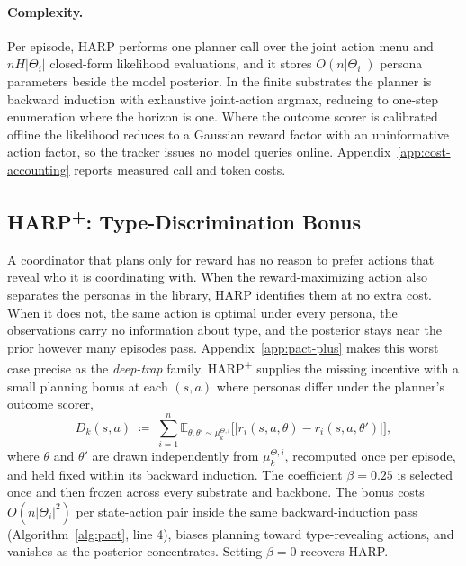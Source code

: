 \documentclass[letterpaper]{article} %
\begin{document}
\paragraph{Complexity.} Per episode, HARP performs one planner call over the joint action menu and $nH|\Theta_i|$ closed-form likelihood evaluations, and it stores $O(n|\Theta_i|)$ persona parameters beside the model posterior. In the finite substrates the planner is backward induction with exhaustive joint-action argmax, reducing to one-step enumeration where the horizon is one. Where the outcome scorer is calibrated offline the likelihood reduces to a Gaussian reward factor with an uninformative action factor, so the tracker issues no model queries online. Appendix~\ref{app:cost-accounting} reports measured call and token costs.

\subsection{HARP\textsuperscript{+}: Type-Discrimination Bonus}
\label{sec:pact-plus-algo}

A coordinator that plans only for reward has no reason to prefer actions that reveal who it is coordinating with. When the reward-maximizing action also separates the personas in the library, HARP identifies them at no extra cost. When it does not, the same action is optimal under every persona, the observations carry no information about type, and the posterior stays near the prior however many episodes pass. Appendix~\ref{app:pact-plus} makes this worst case precise as the \emph{deep-trap} family. HARP\textsuperscript{+} supplies the missing incentive with a small planning bonus at each $(s,a)$ where personas differ under the planner's outcome scorer,
\begin{equation}
\label{eq:bonus}
D_k(s,a) \;\coloneqq\; \sum_{i=1}^n \mathbb{E}_{\theta, \theta' \sim \mu_k^{\Theta,i}}\!\big[|r_i(s,a,\theta) - r_i(s,a,\theta')|\big],
\end{equation}
where $\theta$ and $\theta'$ are drawn independently from $\mu_k^{\Theta,i}$, recomputed once per episode, and held fixed within its backward induction. The coefficient $\beta=0.25$ is selected once and then frozen across every substrate and backbone. The bonus costs $O(n|\Theta_i|^2)$ per state-action pair inside the same backward-induction pass (Algorithm~\ref{alg:pact}, line 4), biases planning toward type-revealing actions, and vanishes as the posterior concentrates. Setting $\beta=0$ recovers HARP.
\end{document}
